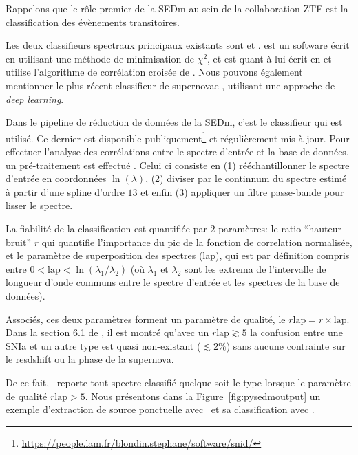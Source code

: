 \documentclass[../main/main.tex]{subfiles}
\begin{document}
Rappelons que le rôle premier de la SEDm au sein de la collaboration ZTF
est la \underline{classification} des évènements transitoires. 

Les deux classifieurs spectraux principaux existants sont 
\citep{HowellSuperfit} et  \citep{BlondinSNID}. 
est un software écrit en  utilisant une méthode de
minimisation de $\chi^{2}$, et  est quant à lui écrit
en  et utilise l'algorithme de corrélation croisée de \citet{TonryDavis}.
Nous pouvons également mentionner le plus récent classifieur de
supernovae  \citep{MuthukrishnaDash}, utilisant une approche de \textit{deep learning}.

Dans le pipeline de réduction de données de la SEDm, c'est le
classifieur  qui est utilisé. Ce dernier est disponible publiquement\footnote{\url{https://people.lam.fr/blondin.stephane/software/snid/}} et
régulièrement mis à jour. Pour effectuer l'analyse des corrélations
entre le spectre d'entrée et la base de données, un pré-traitement est
effectué \citep[section 2.3 de][]{BlondinSNID}. Celui ci consiste en (1) rééchantillonner le spectre d'entrée en coordonnées
$\ln(\lambda)$, (2) diviser par le continnum du spectre estimé à partir
d'une spline d'ordre $13$ et enfin (3) appliquer un filtre passe-bande
pour lisser le spectre.

La fiabilité de la classification est quantifiée par $2$ paramètres: le
ratio ``hauteur-bruit'' $r$ qui quantifie l'importance du pic de la
fonction de correlation normalisée, et le paramètre de superposition des
spectres (lap), qui est par définition compris entre
$0<\text{lap}<\ln(\lambda_{1}/\lambda_{2})$ (où $\lambda_{1}$ et $\lambda_{2}$
sont les extrema de l'intervalle de longueur d'onde communs entre le
spectre d'entrée et les spectres de la base de données).

Associés, ces deux paramètres forment un paramètre de qualité, le
$r\text{lap}=r\times\text{lap}$. Dans la section 6.1 de
\citet{BlondinSNID}, il est montré qu'avec un $r\text{lap}\gtrsim 5$
la confusion entre une SNIa et un autre type est quasi non-existant
($\lesssim2\%$) sans aucune contrainte sur le resdshift ou la phase de
la supernova.

De ce fait, \pysedm\ reporte tout spectre classifié quelque soit le type
lorsque le paramètre de qualité $r\text{lap}>5$. Nous présentons dans la
Figure~\ref{fig:pysedmoutput} un exemple d'extraction de source
ponctuelle avec \pysedm\ et sa classification avec .
\end{document}
